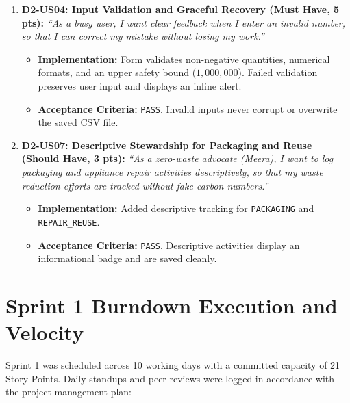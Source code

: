 \documentclass[12pt,a4paper]{article}
\newcommand{\code}[1]{\texttt{#1}}
\begin{document}
\begin{enumerate}[leftmargin=*]
  \item \textbf{D2-US04: Input Validation and Graceful Recovery (Must Have, 5 pts):}
    \textit{``As a busy user, I want clear feedback when I enter an invalid number, so that I can correct my mistake without losing my work.''}
    \begin{itemize}[nosep]
      \item \textbf{Implementation:} Form validates non-negative quantities, numerical formats, and an upper safety bound ($1,000,000$). Failed validation preserves user input and displays an inline alert.
      \item \textbf{Acceptance Criteria:} \code{PASS}. Invalid inputs never corrupt or overwrite the saved CSV file.
    \end{itemize}

  \item \textbf{D2-US07: Descriptive Stewardship for Packaging and Reuse (Should Have, 3 pts):}
    \textit{``As a zero-waste advocate (Meera), I want to log packaging and appliance repair activities descriptively, so that my waste reduction efforts are tracked without fake carbon numbers.''}
    \begin{itemize}[nosep]
      \item \textbf{Implementation:} Added descriptive tracking for \code{PACKAGING} and \code{REPAIR\_REUSE}.
      \item \textbf{Acceptance Criteria:} \code{PASS}. Descriptive activities display an informational badge and are saved cleanly.
    \end{itemize}
\end{enumerate}

\section{Sprint 1 Burndown Execution and Velocity}

Sprint 1 was scheduled across 10 working days with a committed capacity of 21 Story Points. Daily standups and peer reviews were logged in accordance with the project management plan:
\end{document}
